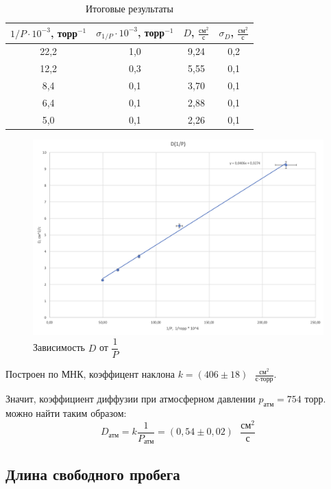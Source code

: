 \documentclass[a4paper,12pt]{article}
\begin{document}
    \begin{table}[!h]
        \centering
        \begin{tabular}{|c|c|c|c|}
            \hline
            $ 1/P \cdot 10^{-3} $, торр$ ^{-1} $  & $ \sigma_{1/P} \cdot 10^{-3} $, торр$ ^{-1} $ & $ D $, $ \frac{\text{см}^2}{\text{с}} $ & $ \sigma_D $, $ \frac{\text{см}^2}{\text{с}} $ \\ \hline
            22,2 & 1,0 & 9,24 & 0,2 \\ \hline
            12,2 & 0,3 & 5,55 & 0,1 \\ \hline
            8,4 & 0,1 & 3,70 & 0,1 \\ \hline
            6,4 & 0,1 & 2,88 & 0,1 \\ \hline
            5,0 & 0,1 & 2,26 & 0,1 \\ \hline
        \end{tabular}
        \caption{Итоговые результаты}
    \end{table}


    \begin{figure}[H]
        \centering
        \includegraphics[width=1\textwidth]{graph.png}
        \caption{Зависимость $ D $ от $ \dfrac{1}{P}$}
    \end{figure}

    Построен по МНК, коэффицент наклона $k = (406 \pm 18)\text{ } \frac{\text{см}^2}{\text{с}\cdot\text{торр}}$. 
	
	Значит, коэффициент диффузии при атмосферном давлении $p_{атм} = 754$ торр. можно найти таким образом:\[D_\text{атм} = k\dfrac{1}{P_\text{атм}} = (0,54 \pm0,02)\text{ } \frac{\text{см}^2}{\text{с}}\]
	
	\subsection*{Длина свободного пробега}
	
\end{document}
